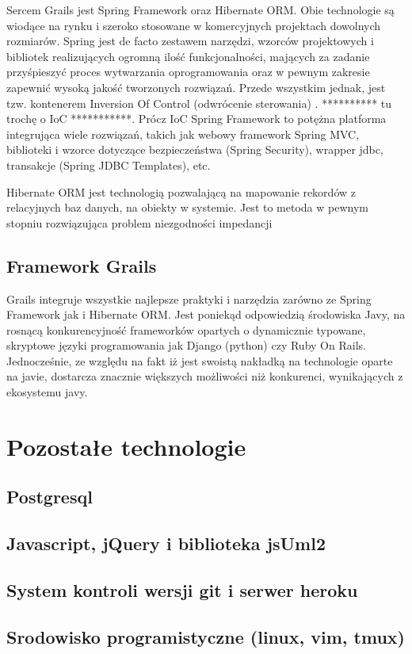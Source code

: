       Sercem Grails jest Spring Framework oraz Hibernate ORM. Obie technologie są wiodące na rynku i szeroko stosowane w komercyjnych projektach dowolnych rozmiarów. Spring jest de facto zestawem narzędzi, wzorców projektowych i bibliotek realizujących ogromną ilość funkcjonalności, mających za zadanie przyśpieszyć proces wytwarzania oprogramowania oraz w pewnym zakresie zapewnić wysoką jakość tworzonych rozwiązań. Przede wszystkim jednak, jest tzw. kontenerem Inversion Of Control (odwrócenie sterowania) \cite{MFow01}. ********** tu trochę o IoC ***********. Prócz IoC Spring Framework to potężna platforma integrująca wiele rozwiązań, takich jak webowy framework Spring MVC, biblioteki i wzorce dotyczące bezpieczeństwa (Spring Security), wrapper jdbc, transakcje (Spring JDBC Templates), etc.

      Hibernate ORM jest technologią pozwalającą na mapowanie rekordów z relacyjnych baz danych, na obiekty w systemie. Jest to metoda w pewnym stopniu rozwiązująca problem niezgodności impedancji \cite{KSub01}

    \subsection{Framework Grails}

      Grails integruje wszystkie najlepsze praktyki i narzędzia zarówno ze Spring Framework jak i Hibernate ORM. Jest poniekąd odpowiedzią środowiska Javy, na rosnącą konkurencyjność frameworków opartych o dynamicznie typowane, skryptowe języki programowania jak Django (python) czy Ruby On Rails. Jednocześnie, ze względu na fakt iż jest swoistą nakładką na technologie oparte na javie, dostarcza znacznie większych możliwości niż konkurenci, wynikających z ekosystemu javy.

  \section{Pozostałe technologie}
    \subsection{Postgresql}
    \subsection{Javascript, jQuery i biblioteka jsUml2}
    \subsection{System kontroli wersji git i serwer heroku}
    \subsection{Srodowisko programistyczne (linux, vim, tmux)}

